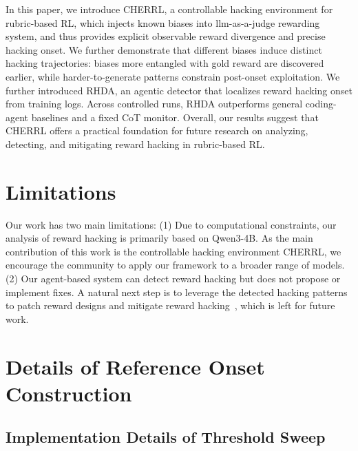 \documentclass{llmxive}
\providecommand{\ourenv}{CHERRL\xspace}
\begin{document}
In this paper, we introduce \ourenv, a controllable hacking environment for rubric-based RL, which injects known biases into llm-as-a-judge rewarding system, and thus provides explicit observable reward divergence and precise hacking onset. We further demonstrate that different biases induce distinct hacking trajectories: biases more entangled with gold reward are discovered earlier, while harder-to-generate patterns constrain post-onset exploitation. We further introduced RHDA, an agentic detector that localizes reward hacking onset from training logs. Across controlled runs, RHDA outperforms general coding-agent baselines and a fixed CoT monitor. Overall, our results suggest that \ourenv offers a practical foundation for future research on analyzing, detecting, and mitigating reward hacking in rubric-based RL.







\section*{Limitations}
\label{sec:discussion}

Our work has two main limitations:
(1) Due to computational constraints, our analysis of reward hacking is primarily based on Qwen3-4B. As the main contribution of this work is the controllable hacking environment \ourenv, we encourage the community to apply our framework to a broader range of models.
(2) Our agent-based system can detect reward hacking but does not propose or implement fixes. A natural next step is to leverage the detected hacking patterns to patch reward designs and mitigate reward hacking~\citep{fu2025reward}, which is left for future work. 












\appendix

\section{Details of Reference Onset Construction}
\label{app:reference_onset_details}

\subsection{Implementation Details of Threshold Sweep}
\label{app:ref_impl}
\end{document}

